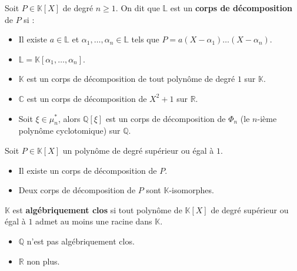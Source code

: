 	\begin{definition}
		Soit $P \in \mathbb{K}[X]$ de degré $n \geq 1$. On dit que $\mathbb{L}$ est un \textbf{corps de décomposition} de $P$ si :
		\begin{itemize}
			\item Il existe $a \in \mathbb{L}$ et $\alpha_1, \dots, \alpha_n \in \mathbb{L}$ tels que $P = a(X-\alpha_1) \dots (X-\alpha_n)$.
			\item $\mathbb{L} = \mathbb{K}[\alpha_1, \dots, \alpha_n]$.
		\end{itemize}
	\end{definition}

	\begin{example}
		\begin{itemize}
			\item $\mathbb{K}$ est un corps de décomposition de tout polynôme de degré $1$ sur $\mathbb{K}$.
			\item $\mathbb{C}$ est un corps de décomposition de $X^2+1$ sur $\mathbb{R}$.
			\item Soit $\xi \in \mu_n^*$, alors $\mathbb{Q}[\xi]$ est un corps de décomposition de $\Phi_n$ (le $n$-ième polynôme cyclotomique) sur $\mathbb{Q}$.
		\end{itemize}
	\end{example}

	\begin{theorem}
		Soit $P \in \mathbb{K}[X]$ un polynôme de degré supérieur ou égal à $1$.
		\begin{itemize}
			\item Il existe un corps de décomposition de $P$.
			\item Deux corps de décomposition de $P$ sont $\mathbb{K}$-isomorphes.
		\end{itemize}
	\end{theorem}

	\begin{definition}
		$\mathbb{K}$ est \textbf{algébriquement clos} si tout polynôme de $\mathbb{K}[X]$ de degré supérieur ou égal à $1$ admet au moins une racine dans $\mathbb{K}$.
	\end{definition}

	\begin{example}
		\begin{itemize}
			\item $\mathbb{Q}$ n'est pas algébriquement clos.
			\item $\mathbb{R}$ non plus.
		\end{itemize}
	\end{example}

